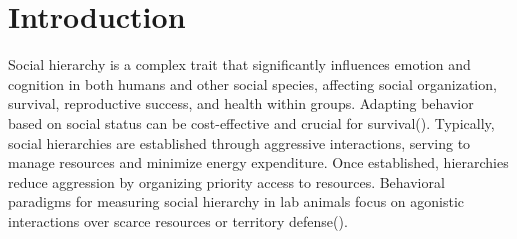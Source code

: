 \documentclass[english, a4paper, 11pt]{article}
\begin{document}
\newpage

\onehalfspacing






\maketitle




\section*{Introduction}
Social hierarchy is a complex trait that significantly influences emotion and cognition in both humans and other social species, affecting social organization, survival, reproductive success, and health within groups. Adapting behavior based on social status can be cost-effective and crucial for survival(\cite{vesseyDominanceControl1981}). Typically, social hierarchies are established through aggressive interactions, serving to manage resources and minimize energy expenditure. Once established, hierarchies reduce aggression by organizing priority access to resources. Behavioral paradigms for measuring social hierarchy in lab animals focus on agonistic interactions over scarce resources or territory defense(\cite{zhouAdvancesUnderstandingNeural2018}).
\end{document}
